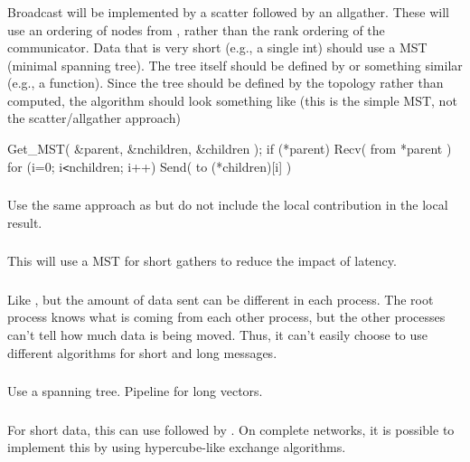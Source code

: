 \documentclass{article}
\begin{document}
\subsubsection{}
Broadcast will be implemented by a scatter followed by an allgather.  These
will use an ordering of nodes from , rather than
the rank ordering of the communicator.
Data that is very short (e.g., a single int) should use a MST (minimal
spanning tree).  The tree itself should be defined by
 or something similar (e.g., a
 function).  
Since the tree should be defined by the topology rather than computed, the
algorithm should look something like (this is the simple MST, not the
scatter/allgather approach)
\begin{algorithm}
Get_MST( \&parent, \&nchildren, \&children );
if (*parent) 
    Recv( from *parent )
for (i=0; i\texttt{<}nchildren; i++)
    Send( to (*children)[i] )
\end{algorithm}

\subsubsection{}
Use the same approach as  but do not include the local
contribution in the local result.

\subsubsection{}
This will use a MST for short gathers to reduce the impact of latency.  

\subsubsection{}
Like , but the amount of data sent can be different in
each process.  The root process knows what is coming from each other process,
but the other processes can't tell how much data is being moved.  Thus, it
can't easily choose to use different algorithms for short and long messages.  

\subsubsection{}
Use a spanning tree.  Pipeline for long vectors.

\subsubsection{}
For short data, this can use  followed by
.  On 
complete networks, it is possible to implement this by using hypercube-like
exchange algorithms.
\end{document}
